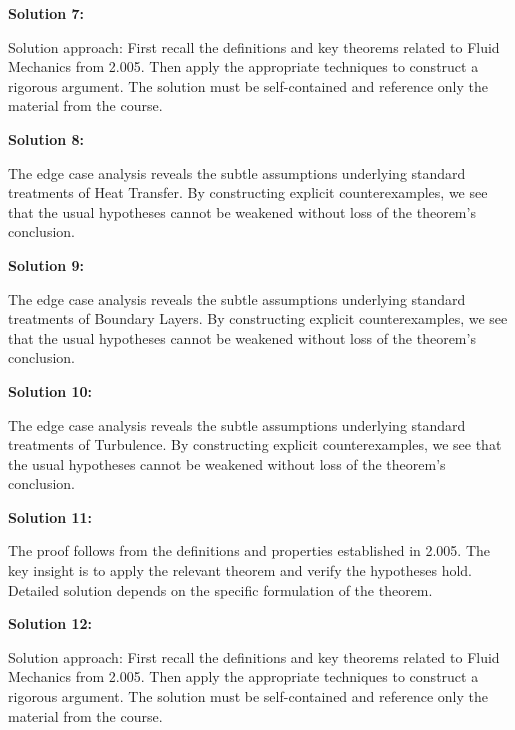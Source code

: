 \documentclass[12pt,a4paper]{exam}
\begin{document}
\vspace{0.5cm}

\textbf{Solution 7:}

Solution approach: First recall the definitions and key theorems related to Fluid Mechanics from 2.005. Then apply the appropriate techniques to construct a rigorous argument. The solution must be self-contained and reference only the material from the course.

\vspace{0.5cm}

\textbf{Solution 8:}

The edge case analysis reveals the subtle assumptions underlying standard treatments of Heat Transfer. By constructing explicit counterexamples, we see that the usual hypotheses cannot be weakened without loss of the theorem's conclusion.

\vspace{0.5cm}

\textbf{Solution 9:}

The edge case analysis reveals the subtle assumptions underlying standard treatments of Boundary Layers. By constructing explicit counterexamples, we see that the usual hypotheses cannot be weakened without loss of the theorem's conclusion.

\vspace{0.5cm}

\textbf{Solution 10:}

The edge case analysis reveals the subtle assumptions underlying standard treatments of Turbulence. By constructing explicit counterexamples, we see that the usual hypotheses cannot be weakened without loss of the theorem's conclusion.

\vspace{0.5cm}

\textbf{Solution 11:}

The proof follows from the definitions and properties established in 2.005. The key insight is to apply the relevant theorem and verify the hypotheses hold. Detailed solution depends on the specific formulation of the theorem.

\vspace{0.5cm}

\textbf{Solution 12:}

Solution approach: First recall the definitions and key theorems related to Fluid Mechanics from 2.005. Then apply the appropriate techniques to construct a rigorous argument. The solution must be self-contained and reference only the material from the course.
\end{document}
